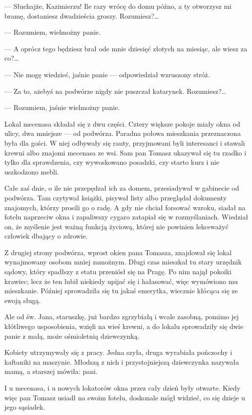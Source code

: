 — Słuchajże, Kazimierzu! Ile razy wrócę do domu późno, a ty otworzysz
mi bramę, dostaniesz dwadzieścia groszy. Rozumiesz?…

— Rozumiem, wielmożny panie.

— A oprócz tego będziesz brał ode mnie dziesięć złotych na miesiąc,
ale wiesz za co?…

— Nie mogę wiedzieć, jaśnie panie — odpowiedział wzruszony stróż.

— Za to, ażebyś na podwórze nigdy nie puszczał katarynek. Rozumiesz?…

— Rozumiem, jaśnie wielmożny panie.

Lokal mecenasa składał się z dwu części. Cztery większe pokoje miały
okna od ulicy, dwa mniejsze — od podwórza. Paradna połowa mieszkania
przeznaczona była dla gości. W niej odbywały się rauty, przyjmowani
byli interesanci i stawali krewni albo znajomi mecenasa ze wsi. Sam
pan Tomasz ukazywał się tu rzadko i tylko dla sprawdzenia, czy
wywoskowano posadzki, czy starto kurz i nie uszkodzono mebli.

Całe zaś dnie, o ile nie przepędzał ich za domem, przesiadywał w
gabinecie od podwórza. Tam czytywał książki, pisywał listy albo
przeglądał dokumenty znajomych, którzy prosili go o radę. A gdy nie
chciał forsować wzroku, siadał na fotelu naprzeciw okna i zapaliwszy
cygaro zatapiał się w rozmyślaniach. Wiedział on, że myślenie jest
ważną funkcją życiową, której nie powinien lekceważyć człowiek dbający
o zdrowie.

Z drugiej strony podwórza, wprost okien pana Tomasza, znajdował się
lokal wynajmowany osobom mniej zamożnym. Długi czas mieszkał tu stary
urzędnik sądowy, który spadłszy z etatu przeniósł się na Pragę. Po nim
najął pokoiki krawiec; lecz że ten lubił niekiedy upijać się i
hałasować, więc wymówiono mu mieszkanie. Później sprowadziła się tu
jakaś emerytka, wiecznie kłócąca się ze swoją sługą.

Ale od św. Jana, staruszkę, już bardzo zgrzybiałą i wcale zasobną,
pomimo jej kłótliwego usposobienia, wzięli na wieś krewni, a do lokalu
sprowadziły się dwie panie z małą, może ośmioletnią dziewczynką.

Kobiety utrzymywały się z pracy. Jedna szyła, druga wyrabiała
pończochy i kaftaniki na maszynie. Młodszą z nich i przystojniejszą
dziewczynka nazywała mamą, a starszej mówiła: pani.

I u mecenasa, i u nowych lokatorów okna przez cały dzień były
otwarte. Kiedy więc pan Tomasz usiadł na swoim fotelu, doskonale mógł
widzieć, co się dzieje u jego sąsiadek.

